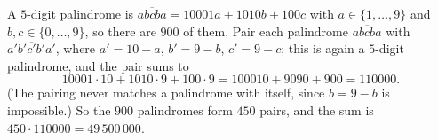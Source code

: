 A $5$-digit palindrome is $\overline{abcba}=10001a+1010b+100c$ with $a\in\{1,\ldots,9\}$ and $b,c\in\{0,\ldots,9\}$, so there are $900$ of them. Pair each palindrome $\overline{abcba}$ with $\overline{a'b'c'b'a'}$, where $a'=10-a$, $b'=9-b$, $c'=9-c$; this is again a $5$-digit palindrome, and the pair sums to
\[10001\cdot10+1010\cdot9+100\cdot9=100010+9090+900=110000 .\]
(The pairing never matches a palindrome with itself, since $b=9-b$ is impossible.) So the $900$ palindromes form $450$ pairs, and the sum is $450\cdot110000=\boxed{49\,500\,000}$.
